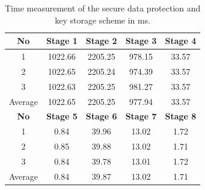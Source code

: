 
\begin{table}[htbp]
  \centering
  \caption{Time measurement of the secure data protection and key storage scheme in ms.}
    \begin{tabular}{|c|c|c|c|c|}
    \hline
    \textbf{No} & \textbf{Stage 1} & \textbf{Stage 2} & \textbf{Stage 3} & \textbf{Stage 4} \\
    \hline
    1     & 1022.66 & 2205.25 & 978.15 & 33.57 \\
    \hline
    2     & 1022.65 & 2205.24 & 974.39 & 33.57 \\
    \hline
    3     & 1022.63 & 2205.25 & 981.27 & 33.57 \\
    \hline
    Average & 1022.65 & 2205.25 & 977.94 & 33.57 \\
    \hline
    \textbf{No} & \textbf{Stage 5} & \textbf{Stage 6} & \textbf{Stage 7} & \textbf{Stage 8} \\
    \hline
    1     & 0.84  & 39.96 & 13.02 & 1.72 \\
    \hline
    2     & 0.85  & 39.88 & 13.02 & 1.71 \\
    \hline
    3     & 0.84  & 39.78 & 13.01 & 1.72 \\
    \hline
    Average & 0.84  & 39.87 & 13.02 & 1.71 \\
    \hline
    \end{tabular}%
  \label{tab:time_scheme}%
\end{table}%


